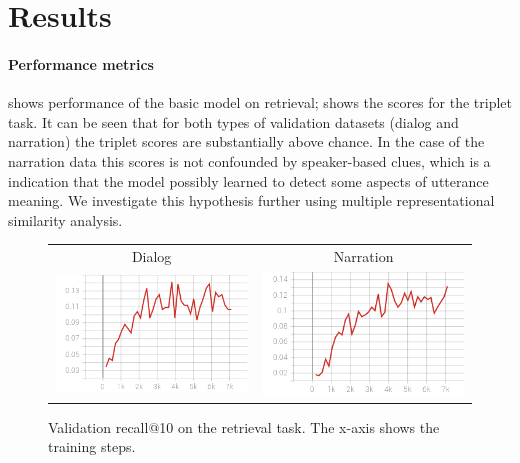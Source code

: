 \section{Results}
\label{sec:results}
\paragraph{Performance metrics}
  shows performance of the basic model on
 retrieval;  shows the scores for the triplet
 task. It can be seen that for both types of validation datasets
 (dialog and narration) the triplet scores are substantially above
 chance. In the case of the narration data this scores is not
 confounded by speaker-based clues, which is a indication that the
 model possibly learned to detect some aspects of utterance
 meaning. We investigate this hypothesis further using multiple
 representational similarity analysis.
 

\begin{figure}
  \centering
  \begin{tabular}{cc}
    Dialog & Narration \\
    \includegraphics[scale=0.3]{val_rec10.png} & \includegraphics[scale=0.3]{valnarr_rec10.png}\\
  \end{tabular}
  \caption{Validation recall@10 on the retrieval task. The x-axis
    shows the training steps.}
  \label{fig:retrieval}
\end{figure}

